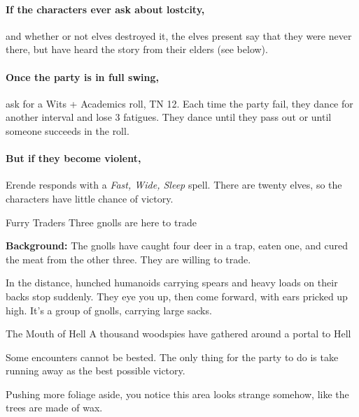 
\paragraph{If the characters ever ask about \gls{lostcity},}
and whether or not elves destroyed it, the elves present say that they were never there, but have heard the story from their elders (see below).

\paragraph{Once the party is in full swing,}
ask for a Wits + Academics roll, TN 12.
Each time the party fail, they dance for another \gls{interval} and lose 3 \glspl{fatigue}.
They dance until they pass out or until someone succeeds in the roll.

\paragraph{But if they become violent,}
Erende responds with a \textit{Fast, Wide, Sleep} spell.
There are twenty elves, so the characters have little chance of victory.

{Furry Traders}%
{Three gnolls are here to trade}%

\textbf{Background:}
The gnolls have caught four deer in a trap, eaten one, and cured the meat from the other three.  They are willing to trade.

\begin{boxtext}

  In the distance, hunched humanoids carrying spears and heavy loads on their backs stop suddenly.
  They eye you up, then come forward, with ears pricked up high.
  It's a group of gnolls, carrying large sacks.

\end{boxtext}


{\N The Mouth of Hell}%
{A thousand woodspies have gathered around a portal to Hell}%

Some encounters cannot be bested. The only thing for the party to do is take running away as the best possible victory.

\begin{boxtext}

  Pushing more foliage aside, you notice this area looks strange somehow, like the trees are made of wax.

\end{boxtext}

